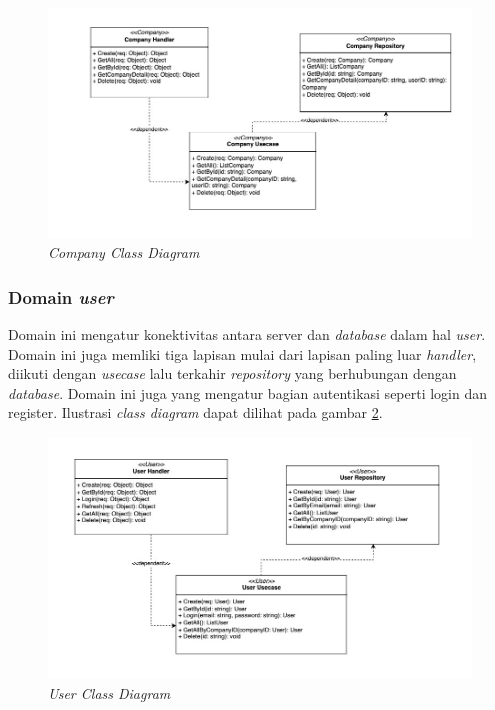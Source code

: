 \begin{figure}[ht]
  \centering
  \includegraphics[width=1\textwidth]{resources/chapter-3/class/company-class-diagram.jpg}
  \caption{\textit{Company Class Diagram}}
  \label{fig:company-class-diagram}
\end{figure}

\subsubsection{Domain \textit{user}}

Domain ini mengatur konektivitas antara server dan \textit{database} dalam hal \textit{user}. Domain ini juga memliki tiga lapisan mulai dari lapisan paling luar \textit{handler}, diikuti dengan \textit{usecase} lalu terkahir \textit{repository} yang berhubungan dengan \textit{database}. Domain ini juga yang mengatur bagian autentikasi seperti login dan register. Ilustrasi \textit{class diagram} dapat dilihat pada gambar \ref{fig:user-class-diagram}.

\begin{figure}[ht]
  \centering
  \includegraphics[width=1\textwidth]{resources/chapter-3/class/user-class-diagram.jpg}
  \caption{\textit{User Class Diagram}}
  \label{fig:user-class-diagram}
\end{figure}


